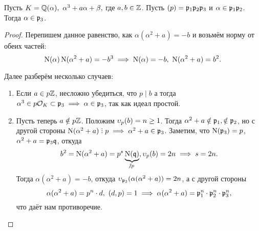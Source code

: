 	  \begin{statement} 
	  	Пусть $K = \mathbb{Q}(\alpha), \ \alpha^3 + a \alpha + \beta,$ где $a, b \in \mathbb{Z}$. Пусть $(p) = \mathfrak{p}_1 \mathfrak{p}_2 \mathfrak{p}_3$ и $\alpha \in \mathfrak{p}_1 \mathfrak{p}_2$. Тогда $\alpha \in \mathfrak{p}_3$.
	  \end{statement}
	  \begin{proof}
	  	Перепишем данное равенство, как $\alpha(\alpha^2 + a) = - b$ и возьмём норму от обеих частей: 
	  	\[
	  		\operatorname{\mathrm{N}}(\alpha)\operatorname{\mathrm{N}}(\alpha^2 + a) = - b^3 \implies \operatorname{\mathrm{N}}(\alpha) = -b, \ \operatorname{\mathrm{N}}(\alpha^2 + a) = b^2. 
	  	\]

	  	Далее разберём несколько случаев: 
	  	\begin{enumerate}
	  		\item Если $a \in p\mathbb{Z}$, несложно убедиться, что $p \mid b$ а тогда $\alpha^3 \in p\mathcal{O}_{K} \subset \mathfrak{p}_{3} \implies \alpha \in \mathfrak{p}_{3}$, так как идеал простой. 

	  		\item Пусть теперь $a \notin p\mathbb{Z}$. Положим $\upsilon_{p}(b) = n \ge 1$. Тогда $\alpha^2 + a \notin \mathfrak{p}_1, \notin \mathfrak{p}_{2}$, но с другой стороны $\Nm(\alpha^2 + a) \divby p \implies \alpha^2 + a \in \fp_{3}$. Заметим, что $\operatorname{\mathrm{N}}(\mathfrak{p}_3) = p$, $\alpha^2 + a = \mathfrak{p}_{3} \mathfrak{q}$, откуда 
	  		\[
	  			b^2 = \Nm(\alpha^2 + a) = p^s \underbrace{\Nm(\fq)}_{\notdivby p}, \v_{p}(b) = 2n \implies s = 2n. 
	  		\]
	  		Тогда $\alpha(\alpha^2 + a) = -b$, откуда $\upsilon_{\mathfrak{p}_3}(\alpha(\alpha^2 + a)) = 2n$, а с другой стороны
	  		\[
	  		  	\alpha(\alpha^2 + a) = p^n \cdot d, \ (d, p ) = 1 \implies \alpha(\alpha^2 + a) = \mathfrak{p}_1^n \cdot \mathfrak{p}_2^n \cdot \mathfrak{p}_{3}^n,
	  		  \]  
	  		  что даёт нам противоречие. 
	  		
	  	\end{enumerate}

 	  \end{proof}

	  


 



